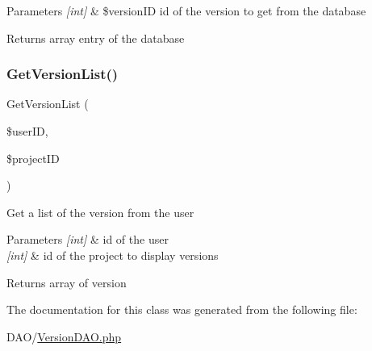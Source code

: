 \begin{DoxyParams}{Parameters}
{\em \mbox{[}int\mbox{]}} & \$version\+ID id of the version to get from the database\\
\hline
\end{DoxyParams}
\begin{DoxyReturn}{Returns}
array entry of the database 
\end{DoxyReturn}
\mbox{\label{class_version_d_a_o_a71cc9114947647898cf8638b38b10de3}} 
\subsubsection{\texorpdfstring{Get\+Version\+List()}{GetVersionList()}}
{\footnotesize\ttfamily Get\+Version\+List (\begin{DoxyParamCaption}\item[{}]{\$user\+ID,  }\item[{}]{\$project\+ID }\end{DoxyParamCaption})}

Get a list of the version from the user


\begin{DoxyParams}{Parameters}
{\em \mbox{[}int\mbox{]}} & id of the user \\
\hline
{\em \mbox{[}int\mbox{]}} & id of the project to display versions\\
\hline
\end{DoxyParams}
\begin{DoxyReturn}{Returns}
array of version 
\end{DoxyReturn}


The documentation for this class was generated from the following file\+:\begin{DoxyCompactItemize}
\item 
D\+A\+O/\hyperlink{_version_d_a_o_8php}{Version\+D\+A\+O.\+php}\end{DoxyCompactItemize}
